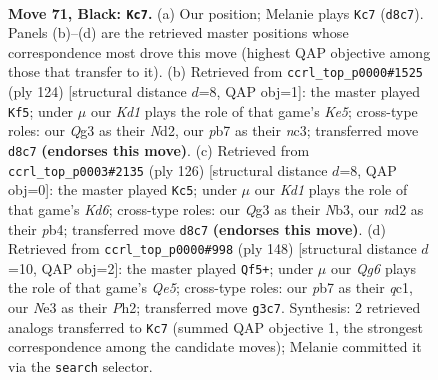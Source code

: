 \documentclass[11pt]{article}
\begin{document}
\clearpage

\begin{figure}[p]\centering
\begin{subfigure}{0.46\textwidth}\centering
\resizebox{\linewidth}{!}{%
\newchessgame
\chessboard[
  setfen={3k4/1P6/7K/8/8/4n1q1/3N4/8 b - - 2 71},
  showmover=false,
  pgfstyle=straightmove, color=movearrow, markmove={d8-c7}
]}
\caption{}
\end{subfigure}\hfill
\begin{subfigure}{0.46\textwidth}\centering
\resizebox{\linewidth}{!}{%
\newchessgame
\chessboard[
  setfen={8/6k1/8/4K1p1/6P1/2n5/3N4/8 w - - 7 63},
  showmover=false,
  pgfstyle=straightmove, color=movearrow, markmove={e5-f5}
]}
\caption{}
\end{subfigure}
\\[4pt]
\begin{subfigure}{0.46\textwidth}\centering
\resizebox{\linewidth}{!}{%
\newchessgame
\chessboard[
  setfen={2k5/8/3K4/8/1p5n/1N1p4/8/8 w - - 2 64},
  showmover=false,
  pgfstyle=straightmove, color=movearrow, markmove={d6-c5}
]}
\caption{}
\end{subfigure}\hfill
\begin{subfigure}{0.46\textwidth}\centering
\resizebox{\linewidth}{!}{%
\newchessgame
\chessboard[
  setfen={8/3k4/6K1/4Q3/6p1/8/7P/2q5 w - - 10 75},
  showmover=false,
  pgfstyle=straightmove, color=movearrow, markmove={e5-f5}
]}
\caption{}
\end{subfigure}
\caption{\textbf{Move 71, Black: \texttt{Kc7}.} (a) Our position; Melanie plays \texttt{Kc7} (\texttt{d8c7}). Panels (b)--(d) are the retrieved master positions whose correspondence most drove this move (highest QAP objective among those that transfer to it). (b) Retrieved from \texttt{ccrl\_top\_p0000\#1525} (ply 124) [structural distance $d$=8, QAP obj=1]: the master played \texttt{Kf5}; under $\mu$ our \emph{Kd1} plays the role of that game's \emph{Ke5}; cross-type roles: our \emph{Q}g3 as their \emph{N}d2, our \emph{p}b7 as their \emph{n}c3; transferred move \texttt{d8c7} \textbf{(endorses this move)}. (c) Retrieved from \texttt{ccrl\_top\_p0003\#2135} (ply 126) [structural distance $d$=8, QAP obj=0]: the master played \texttt{Kc5}; under $\mu$ our \emph{Kd1} plays the role of that game's \emph{Kd6}; cross-type roles: our \emph{Q}g3 as their \emph{N}b3, our \emph{n}d2 as their \emph{p}b4; transferred move \texttt{d8c7} \textbf{(endorses this move)}. (d) Retrieved from \texttt{ccrl\_top\_p0000\#998} (ply 148) [structural distance $d$=10, QAP obj=2]: the master played \texttt{Qf5+}; under $\mu$ our \emph{Qg6} plays the role of that game's \emph{Qe5}; cross-type roles: our \emph{p}b7 as their \emph{q}c1, our \emph{N}e3 as their \emph{P}h2; transferred move \texttt{g3c7}. Synthesis: 2 retrieved analogs transferred to \texttt{Kc7} (summed QAP objective 1, the strongest correspondence among the candidate moves); Melanie committed it via the \texttt{search} selector.}
\label{fig:thought-m141}
\end{figure}
\end{document}
